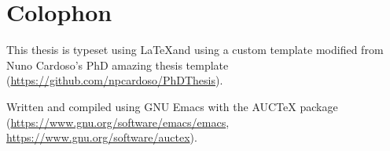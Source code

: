 \chapter*{Colophon}
This thesis is typeset using \LaTeX and  using a custom template modified from Nuno Cardoso's PhD amazing thesis template (\url{https://github.com/npcardoso/PhDThesis}).

Written and compiled using GNU Emacs with the AUCTeX package (\url{https://www.gnu.org/software/emacs/emacs}, \url{https://www.gnu.org/software/auctex}).

